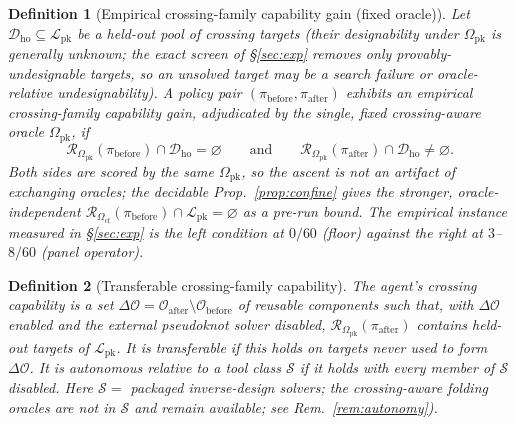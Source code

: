 \documentclass[11pt]{article}
\newtheorem{definition}{Definition}
\newcommand{\PK}{\ensuremath{\mathcal{L}_{\mathrm{pk}}}}
\newcommand{\Ocf}{\ensuremath{\Omega_{\mathrm{cf}}}}
\newcommand{\Opk}{\ensuremath{\Omega_{\mathrm{pk}}}}
\newcommand{\Rze}[2]{\ensuremath{\mathcal{R}_{#1}(#2)}}
\begin{document}
\begin{definition}[Empirical crossing-family capability gain (fixed oracle)]\label{def:ascent}
Let $\mathcal D_{\mathrm{ho}}\subseteq\PK$ be a held-out pool of crossing targets (their designability under
$\Opk$ is generally unknown; the exact screen of \S\ref{sec:exp} removes only \emph{provably}-undesignable
targets, so an unsolved target may be a search failure \emph{or} oracle-relative undesignability). A policy
pair $(\pi_{\mathrm{before}},\pi_{\mathrm{after}})$ exhibits an empirical crossing-family capability gain,
adjudicated by the \emph{single, fixed} crossing-aware oracle $\Opk$, if
\begin{equation}\label{eq:ascent}
  \Rze{\Opk}{\pi_{\mathrm{before}}}\cap\mathcal D_{\mathrm{ho}}=\varnothing
  \qquad\text{and}\qquad
  \Rze{\Opk}{\pi_{\mathrm{after}}}\cap\mathcal D_{\mathrm{ho}}\neq\varnothing .
\end{equation}
Both sides are scored by the \emph{same} $\Opk$, so the ascent is not an artifact of exchanging oracles; the
decidable Prop.~\ref{prop:confine} gives the stronger, oracle-independent
$\Rze{\Ocf}{\pi_{\mathrm{before}}}\cap\PK=\varnothing$ as a pre-run bound. The empirical instance measured in
\S\ref{sec:exp} is the left condition at $0/60$ (floor) against the right at $3$--$8/60$ (panel operator).
\end{definition}

\begin{definition}[Transferable crossing-family capability]\label{def:cap}
The agent's \emph{crossing capability} is a set $\Delta\mathcal{O}=\mathcal{O}_{\mathrm{after}}\setminus
\mathcal{O}_{\mathrm{before}}$ of reusable components such that, with $\Delta\mathcal{O}$ enabled and the
external pseudoknot solver disabled, $\Rze{\Opk}{\pi_{\mathrm{after}}}$ contains \emph{held-out} targets of
$\PK$. It is \emph{transferable} if this holds on targets never used to form $\Delta\mathcal{O}$. It is
\emph{autonomous relative to a tool class $\mathcal S$} if it holds with every member of $\mathcal S$ disabled.
Here $\mathcal S=$ packaged inverse-design solvers; the crossing-aware folding oracles are \emph{not} in
$\mathcal S$ and remain available; see Rem.~\ref{rem:autonomy}).
\end{definition}
\end{document}

